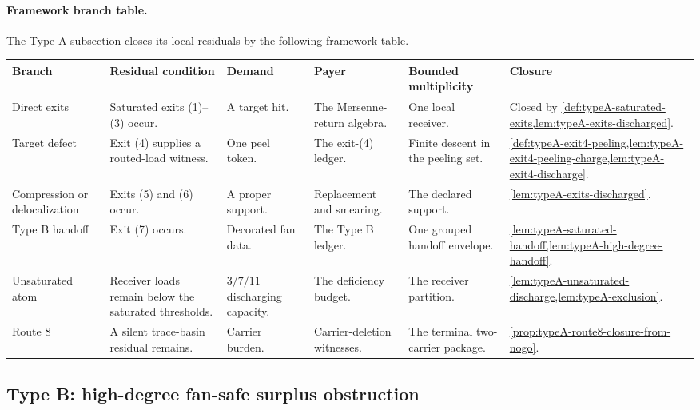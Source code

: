 \documentclass[11pt]{article}
\newcommand{\FrameworkBranchTableHeader}{%
\toprule
\textbf{Branch} & \textbf{Residual condition} & \textbf{Demand} & \textbf{Payer} & \textbf{Bounded multiplicity} & \textbf{Closure}\\
\midrule
}
\begin{document}
\paragraph{Framework branch table.}
The Type A subsection closes its local residuals by the following framework
table.
\begin{longtable}{L{0.13\textwidth} L{0.19\textwidth} L{0.14\textwidth} L{0.14\textwidth} L{0.17\textwidth} L{0.17\textwidth}}
\FrameworkBranchTableHeader
Direct exits
&
Saturated exits \textup{(1)}--\textup{(3)} occur.
&
A target hit.
&
The Mersenne-return algebra.
&
One local receiver.
&
Closed by \cref{def:typeA-saturated-exits,lem:typeA-exits-discharged}.
\\
\addlinespace
Target defect
&
Exit \textup{(4)} supplies a routed-load witness.
&
One peel token.
&
The exit-\textup{(4)} ledger.
&
Finite descent in the peeling set.
&
\cref{def:typeA-exit4-peeling,lem:typeA-exit4-peeling-charge,lem:typeA-exit4-discharge}.
\\
\addlinespace
Compression or delocalization
&
Exits \textup{(5)} and \textup{(6)} occur.
&
A proper support.
&
Replacement and smearing.
&
The declared support.
&
\cref{lem:typeA-exits-discharged}.
\\
\addlinespace
Type B handoff
&
Exit \textup{(7)} occurs.
&
Decorated fan data.
&
The Type B ledger.
&
One grouped handoff envelope.
&
\cref{lem:typeA-saturated-handoff,lem:typeA-high-degree-handoff}.
\\
\addlinespace
Unsaturated atom
&
Receiver loads remain below the saturated thresholds.
&
\(3/7/11\) discharging capacity.
&
The deficiency budget.
&
The receiver partition.
&
\cref{lem:typeA-unsaturated-discharge,lem:typeA-exclusion}.
\\
\addlinespace
Route 8
&
A silent trace-basin residual remains.
&
Carrier burden.
&
Carrier-deletion witnesses.
&
The terminal two-carrier package.
&
\cref{prop:typeA-route8-closure-from-nogo}.
\\
\bottomrule
\end{longtable}

\subsection{Type B: high-degree fan-safe surplus obstruction}
\end{document}
